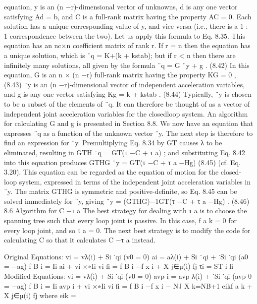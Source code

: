 equation, y is an (n −r)-dimensional vector of unknowns, d is any one vector satisfying Ad = b, and C is a full-rank matrix having the property AC = 0. Each solution has a unique corresponding value of y, and vice versa (i.e., there is a 1 : 1 correspondence between the two). Let us apply this formula to Eq. 8.35. This equation has an nc×n coefficient matrix of rank r. If r = n then the equation has a unique solution, which is ¨q = K+(k + kstab); but if r < n then there are infinitely many solutions, all given by the formula ¨q = G ¨y + g . (8.42) In this equation, G is an n × (n −r) full-rank matrix having the property KG = 0 , (8.43) ¨y is an (n −r)-dimensional vector of independent acceleration variables, and g is any one vector satisfying Kg = k + kstab . (8.44) Typically, ¨y is chosen to be a subset of the elements of ¨q. It can therefore be thought of as a vector of independent joint acceleration variables for the closedloop system. An algorithm for calculating G and g is presented in Section 8.8. We now have an equation that expresses ¨q as a function of the unknown vector ¨y. The next step is therefore to find an expression for ¨y. Premultiplying Eq. 8.34 by GT causes λ to be eliminated, resulting in GTH ¨q = GT(τ −C + τ a) ; and substituting Eq. 8.42 into this equation produces GTHG ¨y = GT(τ −C + τ a −Hg) (8.45) (cf. Eq. 3.20). This equation can be regarded as the equation of motion for the closed-loop system, expressed in terms of the independent joint acceleration variables in ¨y. The matrix GTHG is symmetric and positive-definite, so Eq. 8.45 can be solved immediately for ¨y, giving ¨y = (GTHG)−1GT(τ −C + τ a −Hg) . (8.46) 8.6 Algorithm for C −τ a The best strategy for dealing with τ a is to choose the spanning tree such that every loop joint is passive. In this case, f a k = 0 for every loop joint, and so τ a = 0. The next best strategy is to modify the code for calculating C so that it calculates C −τ a instead.

Original Equations: vi = vλ(i) + Si ˙qi (v0 = 0) ai = aλ(i) + Si ¨qi + ˙Si ˙qi (a0 = −ag) f B i = Ii ai + vi ×∗Ii vi fi = f B i −f x i + X j∈µ(i) fj τi = ST i fi Modified Equations: vi = vλ(i) + Si ˙qi (v0 = 0) avp i = avp λ(i) + ˙Si ˙qi (avp 0 = −ag) f B i = Ii avp i + vi ×∗Ii vi fi = f B i −f x i − NJ X k=NB+1 eikf a k + X j∈µ(i) fj where eik =


